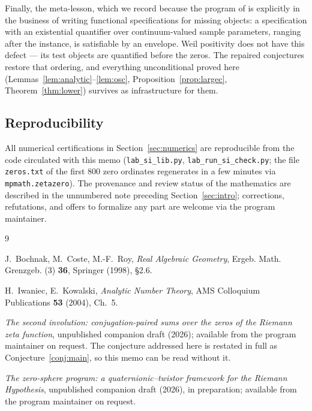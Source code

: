 \documentclass[11pt]{amsart}
\theoremstyle{definition}
\theoremstyle{remark}
\begin{document}
Finally, the meta-lesson, which we record because the program of \cite{ZS,SI} is explicitly in the business of writing functional specifications for missing objects: a specification with an existential quantifier over continuum-valued sample parameters, ranging after the instance, is satisfiable by an envelope. Weil positivity does not have this defect --- its test objects are quantified before the zeros. The repaired conjectures restore that ordering, and everything unconditional proved here (Lemmas~\ref{lem:analytic}--\ref{lem:osc}, Proposition~\ref{prop:largec}, Theorem~\ref{thm:lower}) survives as infrastructure for them.

\subsection*{Reproducibility}
All numerical certifications in Section~\ref{sec:numerics} are reproducible from the code circulated with this memo (\texttt{lab\_si\_lib.py}, \texttt{lab\_run\_si\_check.py}; the file \texttt{zeros.txt} of the first $800$ zero ordinates regenerates in a few minutes via \texttt{mpmath.zetazero}). The provenance and review status of the mathematics are described in the unnumbered note preceding Section~\ref{sec:intro}; corrections, refutations, and offers to formalize any part are welcome via the program maintainer.

\begin{thebibliography}{9}
\itemsep3pt

 J.~Bochnak, M.~Coste, M.-F.~Roy, \emph{Real Algebraic Geometry}, Ergeb. Math. Grenzgeb. (3) \textbf{36}, Springer (1998), \S2.6.

 H.~Iwaniec, E.~Kowalski, \emph{Analytic Number Theory}, AMS Colloquium Publications \textbf{53} (2004), Ch.~5.

 \emph{The second involution: conjugation-paired sums over the zeros of the Riemann zeta function}, unpublished companion draft (2026); available from the program maintainer on request. The conjecture addressed here is restated in full as Conjecture~\ref{conj:main}, so this memo can be read without it.

 \emph{The zero-sphere program: a quaternionic--twistor framework for the Riemann Hypothesis}, unpublished companion draft (2026), in preparation; available from the program maintainer on request.

\end{thebibliography}
\end{document}
